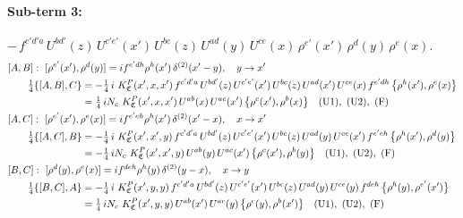 \documentclass[10pt]{article}
\numberwithin{equation}{section}
\begin{document}
\paragraph{Sub-term 3:} $-\,f^{c'd'a}\,U^{bd'}(z)\,U^{c'e'}(x')\,U^{bc}(z)\,U^{ad}(y)\,U^{ce}(x)\,\rho^{e'}(x')\,\rho^{d}(y)\,\rho^{e}(x)$.
\begin{align}
&[A,B]:\ [\rho^{e'}(x'),\rho^{d}(y)]=i f^{e'dh}\rho^{h}(x')\,\delta^{(2)}(x'-y),\quad y\to x'\notag\\
&\qquad \tfrac14\{[A,B],C\}=-\tfrac14\,i\,\,K^{P}_{\mathfrak C}(x',x,x')\,f^{c'd'a}\,U^{bd'}(z)\,U^{c'e'}(x')\,U^{bc}(z)\,U^{ad}(x')\,U^{ce}(x)\,f^{e'dh}\,\big\{\rho^{h}(x'),\rho^{e}(x)\big\}\notag\\
&\qquad\phantom{\tfrac14\{[A,B],C\}}=\tfrac14\,i N_{c}\,\,K^{P}_{\mathfrak C}(x',x,x')\,U^{ab}(x)\,U^{ac}(x')\,\big\{\rho^{c}(x'),\rho^{b}(x)\big\}\quad\text{(U1)},\ \text{(U2)},\ \text{(F)}
\label{B:eq:GIII.VI.P-3-AB}\\
&[A,C]:\ [\rho^{e'}(x'),\rho^{e}(x)]=i f^{e'eh}\rho^{h}(x')\,\delta^{(2)}(x'-x),\quad x\to x'\notag\\
&\qquad \tfrac14\{[A,C],B\}=-\tfrac14\,i\,\,K^{P}_{\mathfrak C}(x',x',y)\,f^{c'd'a}\,U^{bd'}(z)\,U^{c'e'}(x')\,U^{bc}(z)\,U^{ad}(y)\,U^{ce}(x')\,f^{e'eh}\,\big\{\rho^{h}(x'),\rho^{d}(y)\big\}\notag\\
&\qquad\phantom{\tfrac14\{[A,C],B\}}=-\tfrac14\,i N_{c}\,\,K^{P}_{\mathfrak C}(x',x',y)\,U^{ab}(y)\,U^{ac}(x')\,\big\{\rho^{c}(x'),\rho^{b}(y)\big\}\quad\text{(U1)},\ \text{(U2)},\ \text{(F)}
\label{B:eq:GIII.VI.P-3-AC}\\
&[B,C]:\ [\rho^{d}(y),\rho^{e}(x)]=i f^{deh}\rho^{h}(y)\,\delta^{(2)}(y-x),\quad x\to y\notag\\
&\qquad \tfrac14\{[B,C],A\}=-\tfrac14\,i\,\,K^{P}_{\mathfrak C}(x',y,y)\,f^{c'd'a}\,U^{bd'}(z)\,U^{c'e'}(x')\,U^{bc}(z)\,U^{ad}(y)\,U^{ce}(y)\,f^{deh}\,\big\{\rho^{h}(y),\rho^{e'}(x')\big\}\notag\\
&\qquad\phantom{\tfrac14\{[B,C],A\}}=\tfrac14\,i N_{c}\,\,K^{P}_{\mathfrak C}(x',y,y)\,U^{ab}(x')\,U^{ac}(y)\,\big\{\rho^{c}(y),\rho^{b}(x')\big\}\quad\text{(U1)},\ \text{(U2)},\ \text{(F)}
\label{B:eq:GIII.VI.P-3-BC}
\end{align}
\end{document}
